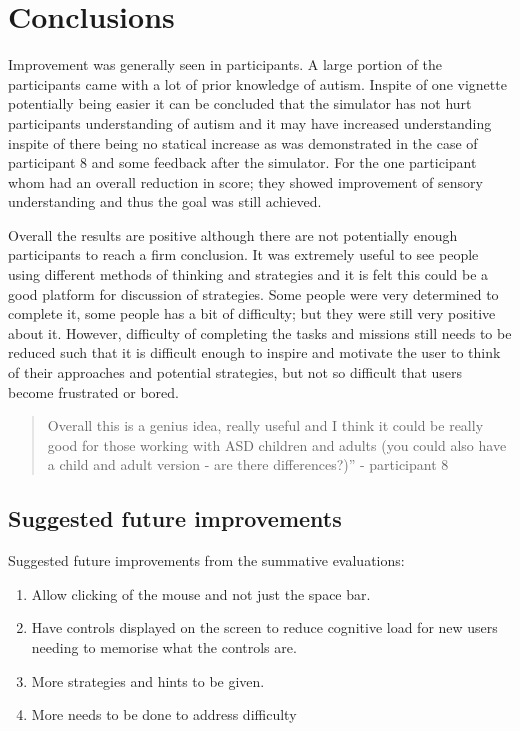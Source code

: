 \section{Conclusions}
Improvement was generally seen in participants. A large portion of the participants came with a lot of prior knowledge of autism. Inspite of one vignette potentially being easier it can be concluded that the simulator has not hurt participants understanding of autism and it may have increased understanding inspite of there being no statical increase as was demonstrated in the case of participant 8 and some feedback after the simulator. For the one participant whom had an overall reduction in score; they showed improvement of sensory understanding and thus the goal was still achieved. 

Overall the results are positive although there are not potentially enough participants to reach a firm conclusion. It was extremely useful to see people using different methods of thinking and strategies and it is felt this could be a good platform for discussion of strategies. Some people were very determined to complete it, some people has a bit of difficulty; but they were still very positive about it. However, difficulty of completing the tasks and missions still needs to be reduced such that it is difficult enough to inspire and motivate the user to think of their approaches and potential strategies, but not so difficult that users become frustrated or bored. 

\begin{quote}
Overall this is a genius idea, really useful and I think it could be really good for those working with ASD children and adults (you could also have a child and adult version - are there differences?)” - participant 8
\end{quote}

\subsection{Suggested future improvements}
Suggested future improvements from the summative evaluations:
\begin{enumerate}
\item Allow clicking of the mouse and not just the space bar.
\item Have controls displayed on the screen to reduce cognitive load for new users needing to memorise what the controls are. 
\item More strategies and hints to be given. 
\item More needs to be done to address difficulty
\end{enumerate}

